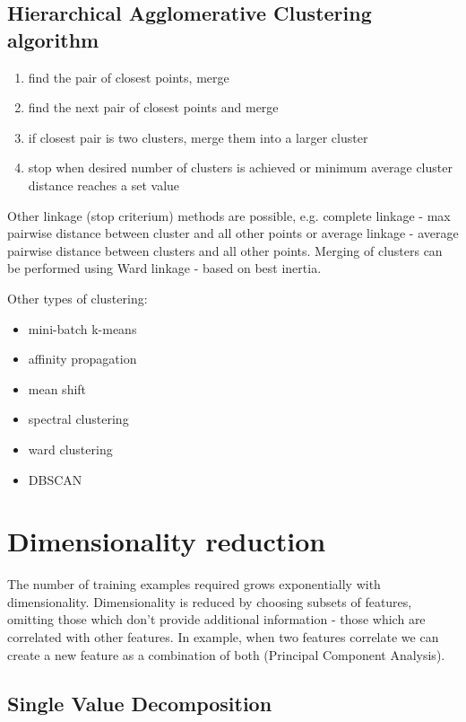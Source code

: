 \documentclass[11pt]{book}
\begin{document}
\subsection{Hierarchical Agglomerative Clustering algorithm}

\begin{enumerate}
    \item find the pair of closest points, merge
    \item find the next pair of closest points and merge
    \item if closest pair is two clusters, merge them into a larger cluster 
    \item stop when desired number of clusters is achieved or minimum average cluster distance reaches a set value
\end{enumerate}

Other linkage (stop criterium) methods are possible, e.g. complete linkage - max pairwise distance between cluster and all other points or average linkage - average pairwise distance between clusters and all other points. Merging of clusters can be performed using Ward linkage - based on best inertia. 

Other types of clustering:
\begin{itemize}
    \item mini-batch k-means
    \item affinity propagation
    \item mean shift
    \item spectral clustering
    \item ward clustering
    \item DBSCAN
\end{itemize}

\section{Dimensionality reduction}

The number of training examples required grows exponentially with dimensionality. Dimensionality is reduced by choosing subsets of features, omitting those which don't provide additional information - those which are correlated with other features. In example, when two features correlate we can create a new feature as a combination of both (Principal Component Analysis). 

\subsection{Single Value Decomposition}
\end{document}
